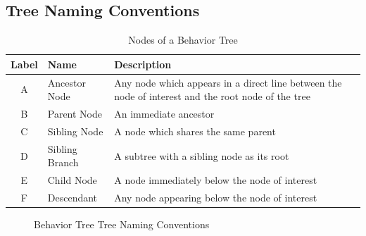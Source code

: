 \documentclass[]{article}
\begin{document}
\clearpage

\subsection{Tree Naming Conventions}

\begin{table}[hb]
\begin{center}
\begin{tabular}{|c|l|p{}|}
\hline
 \textbf{Label} & \textbf{Name} & \textbf{Description} \\ 
 \hline
 \hline
 A & Ancestor Node & Any node which appears in a direct line between the node of interest and the root node of the tree\\ 
 \hline
 B & Parent Node & An immediate ancestor\\ 
 \hline
 C & Sibling Node & A node which shares the same parent\\ 
 \hline
 D & Sibling Branch & A subtree with a sibling node as its root\\
  \hline
 E & Child Node & A node immediately below the node of interest\\ 
 \hline
 F & Descendant & Any node appearing below the node of interest\\ 
 \hline
\end{tabular}
\end{center}
\caption{Nodes of a Behavior Tree}
\label{BTTree Nodes}
\end{table}

\begin{figure}[hb]
 \centering
 \caption{Behavior Tree Tree Naming Conventions}
 \label{fig:Naming2}
\end{figure}
\end{document}

